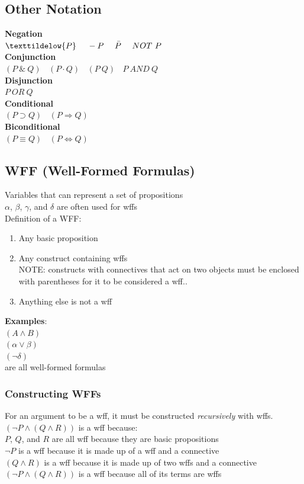 \documentclass[]{article}
\begin{document}
\subsection{Other Notation}
\textbf{Negation}\\
$\texttildelow{P}~~~~-{P}~~~~\bar{P}~~~~NOT~P$
\vspace{5pt}\\
\textbf{Conjunction}\\
$(P~\&~Q)~~~~(P \cdot Q)~~~~(P~Q)~~~~P~AND~Q$
\vspace{5pt}\\
\textbf{Disjunction}\\
$P~OR~Q$
\vspace{5pt}\\
\textbf{Conditional}\\
$(P \supset Q)~~~~(P \Rightarrow Q)$ 
\vspace{5pt}\\
\textbf{Biconditional}\\
$(P \equiv Q)~~~~(P \Leftrightarrow Q)$
\subsection{WFF (Well-Formed Formulas)}
Variables that can represent a set of propositions\\
$\alpha$, $\beta$, $\gamma$, and $\delta$ are often used for wffs\\
Definition of a WFF:
\begin{enumerate}
	\item{Any basic proposition}
	\item{Any construct containing wffs\vspace{5pt}\\
	     NOTE: constructs with connectives that act on two objects must be enclosed with parentheses for it to be considered a wff..}
	\item{Anything else is not a wff}
\end{enumerate}
\textbf{Examples}:\\
$(A \wedge B)$\\
$(\alpha \vee \beta)$\\
$(\neg{\delta})$\\
are all well-formed formulas
\subsubsection{Constructing WFFs}
For an argument to be a wff, it must be constructed \textit{recursively} with wffs.\\
$(\neg{P}\wedge(Q\wedge R))$ is a wff because:\\
$P$, $Q$, and $R$ are all wff because they are basic propositions\\
$\neg{P}$ is a wff because it is made up of a wff and a connective\\
$(Q \wedge R)$ is a wff because it is made up of two wffs and a connective\\
$(\neg{P}\wedge(Q\wedge R))$ is a wff because all of its terms are wffs
\end{document}
